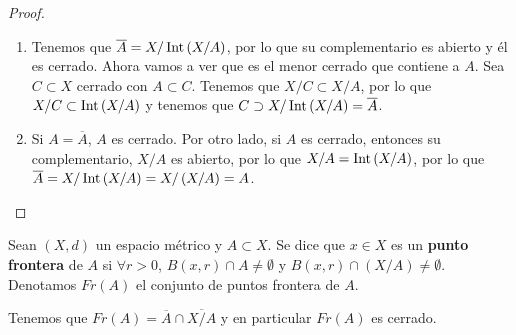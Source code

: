 \begin{proof}
\begin{enumerate}
\item Tenemos que $\displaystyle \overline{A} = X/\operatorname{Int}\left(X/A\right) $, por lo que su complementario es abierto y él es cerrado. Ahora vamos a ver que es el menor cerrado que contiene a $\displaystyle A $. Sea $\displaystyle C \subset X $ cerrado con $\displaystyle A \subset C $. Tenemos que $\displaystyle X/C \subset X/A $, por lo que $\displaystyle X/C \subset \operatorname{Int}\left(X/A\right) $ y tenemos que $\displaystyle C \supset X/\operatorname{Int}\left(X/A\right) = \overline{A} $.
\item Si $\displaystyle A = \overline{A} $, $\displaystyle A  $ es cerrado.
Por otro lado, si $\displaystyle A $ es cerrado, entonces su complementario, $\displaystyle X/A $ es abierto, por lo que $\displaystyle X/A = \operatorname{Int}\left(X/A\right) $, por lo que $\displaystyle \overline{A} = X/\operatorname{Int}\left(X/A\right) = X/\left(X/A\right) = A $.
\end{enumerate}
\end{proof}
\begin{definition}
Sean $\displaystyle \left(X,d\right) $ un espacio métrico y $\displaystyle A \subset X $. Se dice que $\displaystyle x \in X $ es un \textbf{punto frontera} de $\displaystyle A $ si $\displaystyle \forall r > 0 $, $\displaystyle B\left(x,r\right) \cap A \neq \emptyset $ y $\displaystyle B\left(x,r\right) \cap \left(X/A\right) \neq \emptyset $. Denotamos $\displaystyle Fr\left(A\right) $ el conjunto de puntos frontera de $\displaystyle A $.
\end{definition}
\begin{observation}
Tenemos que $\displaystyle Fr\left(A\right) = \overline{A} \cap \overline{X/A} $ y en particular $\displaystyle Fr\left(A\right) $ es cerrado.
\end{observation}
